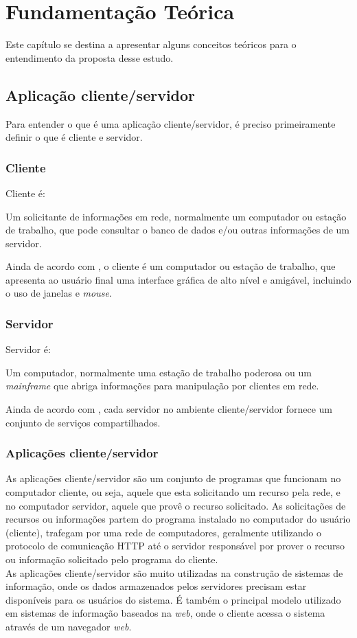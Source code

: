 \chapter{Fundamentação Teórica}\label{cap:fundamentacao-teorica}
Este capítulo se destina a apresentar alguns conceitos teóricos para o 
entendimento da proposta desse estudo.
\section{Aplicação cliente/servidor}
Para entender o que é uma aplicação cliente/servidor, é preciso primeiramente 
definir o que é cliente e servidor.
\subsection{Cliente}
Cliente é:
\begin{citacao}
Um solicitante de informações em rede, normalmente um computador ou estação de 
trabalho, que pode consultar o banco de dados e/ou outras informações de um 
servidor. \cite{stallings2005}
\end{citacao}
Ainda de acordo com , o cliente é um computador ou estação de trabalho, que apresenta ao usuário final uma interface gráfica de alto nível e amigável, incluindo o uso de janelas e \textit{mouse}. 
\subsection{Servidor}
Servidor é:
\begin{citacao}
Um computador, normalmente uma estação de trabalho poderosa ou um \textit{mainframe} que abriga informações para manipulação por clientes em rede. \cite{stallings2005}
\end{citacao}
Ainda de acordo com , cada servidor no ambiente cliente/servidor fornece um conjunto de serviços compartilhados.
\subsection{Aplicações cliente/servidor}
As aplicações cliente/servidor são um conjunto de programas que funcionam no 
computador cliente, ou seja, aquele que esta solicitando um recurso pela rede, 
e no computador servidor, aquele que provê o recurso solicitado. As 
solicitações de recursos ou informações partem do programa instalado no 
computador do usuário (cliente), trafegam por uma rede de computadores, 
geralmente utilizando o protocolo de comunicação HTTP até o servidor 
responsável por prover o recurso ou informação solicitado pelo programa do 
cliente.\\
As aplicações cliente/servidor são muito utilizadas na construção de sistemas de informação, onde os dados armazenados pelos servidores precisam estar disponíveis para os usuários do sistema. É também o principal modelo utilizado em sistemas de informação baseados na \textit{web}, onde o cliente acessa o sistema através de um navegador \textit{web}.

